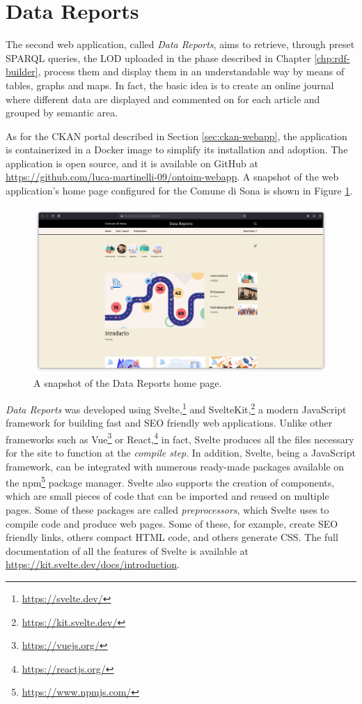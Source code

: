 \section{Data Reports}
\label{sec:datareports-webapp}

The second web application, called \textit{Data Reports}, aims to retrieve, through preset \ac{SPARQL} queries, the \acl{LOD} uploaded in the phase described in Chapter \ref{chp:rdf-builder}, process them and display them in an understandable way by means of tables, graphs and maps. In fact, the basic idea is to create an online journal where different data are displayed and commented on for each article and grouped by semantic area.

As for the CKAN portal described in Section \ref{sec:ckan-webapp}, the application is containerized in a Docker image to simplify its installation and adoption. The application is open source, and it is available on GitHub at \url{https://github.com/luca-martinelli-09/ontoim-webapp}. A snapshot of the web application's home page configured for the Comune di Sona is shown in Figure \ref{fig:data-reports-home}.

\begin{figure}[!ht]
  \centering
  \includegraphics[width=\columnwidth]{images/datareports/datareports-home}
  \caption{A snapshot of the Data Reports home page.}
  \label{fig:data-reports-home}
\end{figure}

\textit{Data Reports} was developed using Svelte,\footnote{\url{https://svelte.dev/}} and SvelteKit,\footnote{\url{https://kit.svelte.dev/}} a modern JavaScript framework for building fast and \acs{SEO} friendly web applications. Unlike other frameworks such as Vue\footnote{\url{https://vuejs.org/}} or React,\footnote{\url{https://reactjs.org/}} in fact, Svelte produces all the files necessary for the site to function at the \textit{compile step}. In addition, Svelte, being a JavaScript framework, can be integrated with numerous ready-made packages available on the npm\footnote{\url{https://www.npmjs.com/}} package manager. Svelte also supports the creation of components, which are small pieces of code that can be imported and reused on multiple pages. Some of these packages are called \textit{preprocessors}, which Svelte uses to compile code and produce web pages. Some of these, for example, create \acs{SEO} friendly links, others compact \acs{HTML} code, and others generate \acs{CSS}. The full documentation of all the features of Svelte is available at \url{https://kit.svelte.dev/docs/introduction}.

